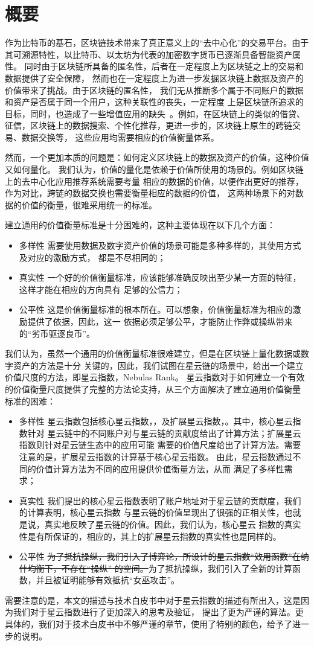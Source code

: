 \section{概要}
作为比特币的基石，区块链技术带来了真正意义上的“去中心化”的交易平台。由于其可溯源特性，以比特币、以太坊为代表的加密数字货币已逐渐具备智能资产属性。
同时由于区块链所具备的匿名性，后者在一定程度上为区块链之上的交易和数据提供了安全保障，
然而也在一定程度上为进一步发掘区块链上数据及资产的价值带来了挑战。由于区块链的匿名性，
我们无从推断多个属于不同账户的数据和资产是否属于同一个用户，这种关联性的丧失，一定程度
上是区块链所追求的目标，同时，也造成了一些增值应用的缺失~\cite{meiklejohn2013fistful}。例如，在区块链上的类似的借贷、
征信，区块链上的数据搜索、个性化推荐，更进一步的，区块链上原生的跨链交易、数据交换等，
这些应用均需要相应的价值衡量体系。

然而，一个更加本质的问题是：如何定义区块链上的数据及资产的价值，这种价值又如何量化。
我们认为，价值的量化是依赖于价值所使用的场景的。例如区块链上的去中心化应用推荐系统需要考量
相应的数据的价值，以便作出更好的推荐，作为对比，跨链的数据交换也需要衡量相应的数据的价值，
这两种场景下的对数据的价值的衡量，很难采用统一的标准。

建立通用的价值衡量标准是十分困难的，这种主要体现在以下几个方面：
\begin{itemize}
\item{多样性} 需要使用数据及数字资产价值的场景可能是多种多样的，其使用方式及对应的激励方式，
都是不尽相同的；
\item{真实性} 一个好的价值衡量标准，应该能够准确反映出至少某一方面的特征，这样才能在相应的方向具有
足够的公信力；
\item{公平性} 这是价值衡量标准的根本所在。可以想象，价值衡量标准为相应的激励提供了依据，因此，这一
依据必须足够公平，才能防止作弊或操纵带来的“劣币驱逐良币”。
\end{itemize}

我们认为，虽然一个通用的价值衡量标准很难建立，但是在区块链上量化数据或数字资产的方法是十分
关键的，因此，我们试图在星云链的场景中，给出一个建立价值尺度的方法，即星云指数，Nebulas Rank。
星云指数对于如何建立一个有效的价值衡量尺度提供了完整的方法论支持，从三个方面解决了建立通用价值衡量
标准的困难：
\begin{itemize}
\item{多样性} 星云指数包括核心星云指数，\nrcore，及扩展星云指数，\nrext。其中，核心星云指数针对
星云链中的不同账户对与星云链的贡献度给出了计算方法；扩展星云指数则针对星云链生态中的应用可能
需要的价值尺度给出了计算方法。需要注意的是，扩展星云指数的计算基于核心星云指数。
由此，星云指数通过不同的价值计算方法为不同的应用提供价值衡量方法，从而
满足了多样性需求；
\item{真实性} 我们提出的核心星云指数表明了账户地址对于星云链的贡献度，我们的计算表明，核心星云指数
与星云链的价值呈现出了很强的正相关性，也就是说，真实地反映了星云链的价值。因此，我们认为，核心星云
指数的真实性是有所保证的，相应的，其上的扩展星云指数的真实性也是同样的。
\item{公平性} {\color{blue} \sout{为了抵抗操纵，我们引入了博弈论，所设计的星云指数“效用函数”在纳什均衡下，不存在“操纵”
的空间。}为了抵抗操纵，我们引入了全新的计算函数，并且被证明能够有效抵抗“女巫攻击”。}
\end{itemize}


需要注意的是，本文的描述与技术白皮书中对于星云指数的描述有所出入，这是因为我们对于星云指数进行了更加深入的思考及验证，
提出了更为严谨的算法。更具体的，我们对于技术白皮书中不够严谨的章节，使用了{\color{gray}特别的颜色}，给予了进一步的说明。
